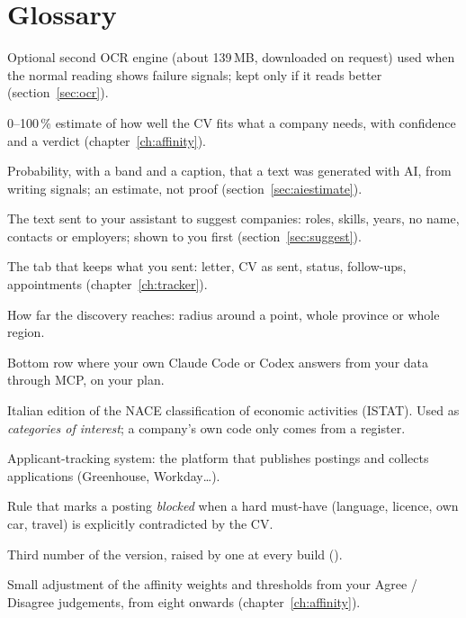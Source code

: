 \chapter*{Glossary}

\begin{description}[style=unboxed, leftmargin=1.2em, itemsep=2pt, font=\normalfont\bfseries\color{othDark}]
\item[Advanced reader] Optional second OCR engine (about 139\,MB, downloaded on request) used when the normal reading shows failure signals; kept only if it reads better (section~\ref{sec:ocr}).
\item[Affinity] 0--100\,\% estimate of how well the CV fits what a company needs, with confidence and a verdict (chapter~\ref{ch:affinity}).
\item[AI-writing estimate] Probability, with a band and a caption, that a text was generated with AI, from writing signals; an estimate, not proof (section~\ref{sec:aiestimate}).
\item[Anonymised brief] The text sent to your assistant to suggest companies: roles, skills, years, no name, contacts or employers; shown to you first (section~\ref{sec:suggest}).
\item[Applications sent] The tab that keeps what you sent: letter, CV as sent, status, follow-ups, appointments (chapter~\ref{ch:tracker}).
\item[Area mode] How far the discovery reaches: radius around a point, whole province or whole region.
\item[Assistant strip] Bottom row where your own Claude Code or Codex answers from your data through MCP, on your plan.
\item[ATECO 2025] Italian edition of the NACE classification of economic activities (ISTAT). Used as \emph{categories of interest}; a company's own code only comes from a register.
\item[ATS] Applicant-tracking system: the platform that publishes postings and collects applications (Greenhouse, Workday\ldots).
\item[Blocking gate] Rule that marks a posting \emph{blocked} when a hard must-have (language, licence, own car, travel) is explicitly contradicted by the CV.
\item[Build number] Third number of the version, raised by one at every build ().
\item[Calibration] Small adjustment of the affinity weights and thresholds from your Agree / Disagree judgements, from eight onwards (chapter~\ref{ch:affinity}).

\end{description}
